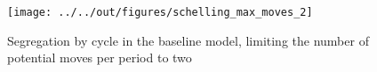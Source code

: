 \documentclass[11pt, a4paper, leqno]{article}
\begin{document}
\begin{figure}
    \caption{Segregation by cycle in the baseline \citet{Schelling69} model, limiting the number of potential moves per period to two}
    
    \texttt{[image: ../../out/figures/schelling\_max\_moves\_2]}

\end{figure}


\pagebreak










\end{document}
